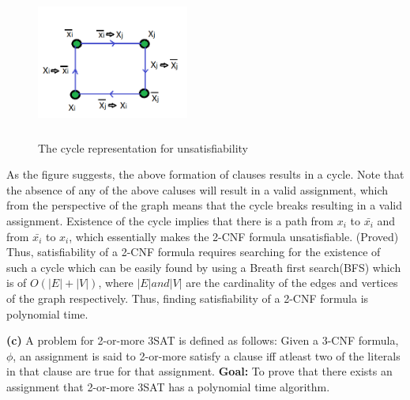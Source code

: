 \documentclass{article}
\renewcommand\part[1]{\vspace{.10in}\textbf{(#1)}}
\begin{document}
  \begin{figure}[h!]
   \centering
  \includegraphics[width=5cm, height=5cm]{Prob1b}
  \caption{The cycle representation for unsatisfiability}
  \end{figure}

 As the figure suggests, the above formation of clauses results in a cycle. Note that the absence of any of the above caluses will result in a valid assignment, which from the perspective of the graph means that the cycle breaks resulting in a valid assignment. Existence of the cycle implies that there is a path from $x_{i}$ to $\bar{x_{i}}$ and from $\bar{x_{i}}$ to $x_{i}$, which essentially makes the 2-CNF formula unsatisfiable. (Proved)
Thus, satisfiability of a 2-CNF formula requires searching for the existence of such a cycle which can be easily found by using a Breath first search(BFS) which is of $O(|E|+|V|)$, where $|E| and |V|$ are the cardinality of the edges and vertices of the graph respectively. Thus, finding satisfiability of a 2-CNF formula is polynomial time.\newline

\part{c} A problem for 2-or-more  3SAT is defined as follows: Given a 3-CNF formula, $\phi$, an assignment is said to 2-or-more satisfy a clause iff atleast two of the literals in that clause are true for that assignment. \textbf {Goal:} To prove that there exists an assignment that 2-or-more 3SAT has a polynomial time algorithm. \newline
\end{document}
